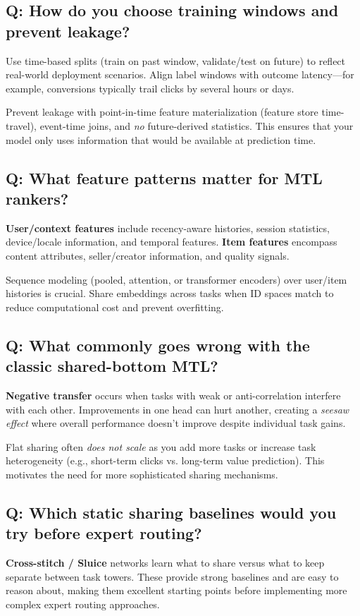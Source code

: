 \subsection*{Q: How do you choose training windows and prevent leakage?}
Use time-based splits (train on past window, validate/test on future) to reflect real-world deployment scenarios. Align label windows with outcome latency---for example, conversions typically trail clicks by several hours or days.

Prevent leakage with point-in-time feature materialization (feature store time-travel), event-time joins, and \emph{no} future-derived statistics. This ensures that your model only uses information that would be available at prediction time.

\subsection*{Q: What feature patterns matter for MTL rankers?}
\textbf{User/context features} include recency-aware histories, session statistics, device/locale information, and temporal features. \textbf{Item features} encompass content attributes, seller/creator information, and quality signals.

Sequence modeling (pooled, attention, or transformer encoders) over user/item histories is crucial. Share embeddings across tasks when ID spaces match to reduce computational cost and prevent overfitting.

\subsection*{Q: What commonly goes wrong with the classic shared-bottom MTL?}
\textbf{Negative transfer} occurs when tasks with weak or anti-correlation interfere with each other. Improvements in one head can hurt another, creating a \emph{seesaw effect} where overall performance doesn't improve despite individual task gains.

Flat sharing often \emph{does not scale} as you add more tasks or increase task heterogeneity (e.g., short-term clicks vs. long-term value prediction). This motivates the need for more sophisticated sharing mechanisms.

\subsection*{Q: Which static sharing baselines would you try before expert routing?}
\textbf{Cross-stitch / Sluice} networks learn what to share versus what to keep separate between task towers. These provide strong baselines and are easy to reason about, making them excellent starting points before implementing more complex expert routing approaches.

